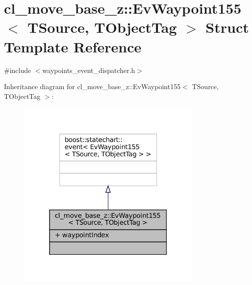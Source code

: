 \hypertarget{structcl__move__base__z_1_1EvWaypoint155}{}\section{cl\+\_\+move\+\_\+base\+\_\+z\+:\+:Ev\+Waypoint155$<$ T\+Source, T\+Object\+Tag $>$ Struct Template Reference}
\label{structcl__move__base__z_1_1EvWaypoint155}


{\ttfamily \#include $<$waypoints\+\_\+event\+\_\+dispatcher.\+h$>$}



Inheritance diagram for cl\+\_\+move\+\_\+base\+\_\+z\+:\+:Ev\+Waypoint155$<$ T\+Source, T\+Object\+Tag $>$\+:
\nopagebreak
\begin{figure}[H]
\begin{center}
\leavevmode
\includegraphics[width=259pt]{structcl__move__base__z_1_1EvWaypoint155__inherit__graph}
\end{center}
\end{figure}


